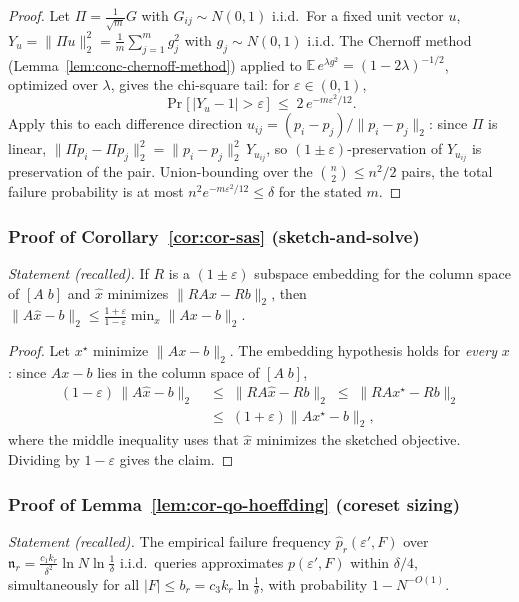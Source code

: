 \begin{proof}
Let $\Pi = \tfrac{1}{\sqrt{m}}G$ with $G_{ij} \sim N(0,1)$ i.i.d.\ For
a fixed unit vector $u$, $Y_u = \|\Pi u\|_2^2 = \tfrac1m\sum_{j=1}^m
g_j^2$ with $g_j \sim N(0,1)$ i.i.d. The Chernoff method
(Lemma~\ref{lem:conc-chernoff-method}) applied to
$\mathbb{E}\,e^{\lambda g^2} = (1-2\lambda)^{-1/2}$, optimized over
$\lambda$, gives the chi-square tail: for $\varepsilon \in (0,1)$,
\[
\Pr\bigl[\,|Y_u - 1| > \varepsilon\,\bigr] \;\le\;
2\,e^{-m\varepsilon^2/12}.
\]
Apply this to each difference direction $u_{ij} = (p_i -
p_j)/\|p_i-p_j\|_2$: since $\Pi$ is linear, $\|\Pi p_i - \Pi
p_j\|_2^2 = \|p_i - p_j\|_2^2\,Y_{u_{ij}}$, so
$(1\pm\varepsilon)$-preservation of $Y_{u_{ij}}$ is preservation of
the pair. Union-bounding over the $\binom{n}{2} \le n^2/2$ pairs, the
total failure probability is at most $n^2 e^{-m\varepsilon^2/12} \le
\delta$ for the stated $m$.
\end{proof}

\subsubsection*{Proof of Corollary~\ref{cor:cor-sas} (sketch-and-solve)}
{\itshape Statement (recalled).} If $R$ is a $(1\pm\varepsilon)$
subspace embedding for the column space of $[A\;b]$ and $\hat{x}$
minimizes $\|RAx - Rb\|_2$, then $\|A\hat{x}-b\|_2 \le
\tfrac{1+\varepsilon}{1-\varepsilon}\min_x \|Ax - b\|_2$.\eop

\begin{proof}
Let $x^{\star}$ minimize $\|Ax - b\|_2$. The embedding hypothesis
holds for \emph{every} $x$: since $Ax - b$ lies in the column space of
$[A\;b]$,
\begin{align*}
(1-\varepsilon)\,\|A\hat{x}-b\|_2
&\;\le\; \|RA\hat{x}-Rb\|_2 \;\le\;
\|RAx^{\star}-Rb\|_2\\
&\;\le\; (1+\varepsilon)\|Ax^{\star}-b\|_2,
\end{align*}
where the middle inequality uses that $\hat{x}$ minimizes the sketched
objective. Dividing by $1-\varepsilon$ gives the claim.
\end{proof}

\subsubsection*{Proof of Lemma~\ref{lem:cor-qo-hoeffding} (coreset sizing)}
{\itshape Statement (recalled).} The empirical failure frequency
$\hat{p}_r(\varepsilon',F)$ over $\mathfrak{n}_r =
\tfrac{c_1k_r}{\delta^2}\ln N\ln\tfrac1\delta$ i.i.d.\ queries
approximates $p(\varepsilon',F)$ within $\delta/4$, simultaneously for
all $|F| \le b_r = c_3k_r\ln\tfrac1\delta$, with probability
$1 - N^{-O(1)}$.\eop

